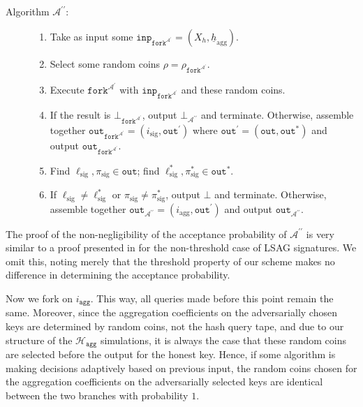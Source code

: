 \documentclass{mrl}
\theoremstyle{definition}
\numberwithin{theorem}{subsection}
\newcommand{\adversary}{\mathcal{A}}
\begin{document}
\begin{description}
\item [Algorithm $\adversary^{\prime \prime}$: ] 

\begin{enumerate}
\item Take as input some $\texttt{inp}_{\texttt{fork}^{\adversary^\prime}} = (X_h, \underline{h}_{\text{agg}})$. 

\item Select some random coins $\rho = \rho_{\texttt{fork}^{\adversary^\prime}}$. 

\item Execute $\texttt{fork}^{\adversary^\prime}$ with $\texttt{inp}_{\texttt{fork}^{\adversary^\prime}}$ and these random coins. 

\item If the result is $\bot_{\texttt{fork}^{\adversary^\prime}}$, output $\bot_{\adversary^{\prime \prime}}$ and terminate. Otherwise, assemble together $\texttt{out}_{\texttt{fork}^{\adversary^\prime}} = (i_{\text{sig}}, \texttt{out}^{\prime})$ where $\texttt{out}^{\prime} = (\texttt{out}, \texttt{out}^*)$ and output $\texttt{out}_{\texttt{fork}^{\adversary^\prime}}$. 

\item Find $\ell_{\text{sig}}, \pi_{\text{sig}} \in \texttt{out}$; find $\ell_{\text{sig}}^*, \pi^*_{\text{sig}} \in \texttt{out}^*$.

\item If $\ell_{\text{sig}} \neq \ell_{\text{sig}}^*$ or $\pi_{\text{sig}} \neq \pi_{\text{sig}}^*$, output $\bot$ and terminate. Otherwise, assemble together $\texttt{out}_{\adversary^{\prime \prime}} = (i_{\text{agg}}, \texttt{out}^{\prime})$ and output $\texttt{out}_{\adversary^{\prime\prime}}$.
\end{enumerate}
\end{description}

The proof of the non-negligibility of the acceptance probability of $\adversary^{\prime \prime}$ is very similar to a proof presented in \cite{liu2004linkable} for the non-threshold case of LSAG signatures. We omit this, noting merely that the threshold property of our scheme makes no difference in determining the acceptance probability. 

Now we fork on $i_{\texttt{agg}}$. This way, all queries made before this point remain the same. Moreover, since the aggregation coefficients on the adversarially chosen keys are determined by random coins, not the hash query tape, and due to our structure of the $\mathcal{H}_{\texttt{agg}}$ simulations, it is always the case that these random coins are selected before the output for the honest key. Hence, if some algorithm is making decisions adaptively based on previous input, the random coins chosen for the aggregation coefficients on the adversarially selected keys are identical between the two branches with probability $1$.
\end{document}
